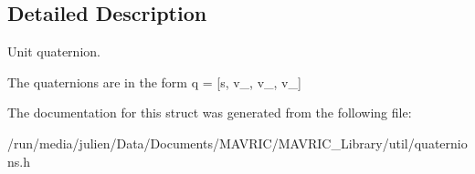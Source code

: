 \subsection{Detailed Description}
Unit quaternion. 

The quaternions are in the form q = \mbox{[}s, v\+\_, v\+\_, v\+\_\mbox{]} 

The documentation for this struct was generated from the following file\+:\begin{DoxyCompactItemize}
\item 
/run/media/julien/\+Data/\+Documents/\+M\+A\+V\+R\+I\+C/\+M\+A\+V\+R\+I\+C\+\_\+\+Library/util/quaternions.\+h\end{DoxyCompactItemize}
